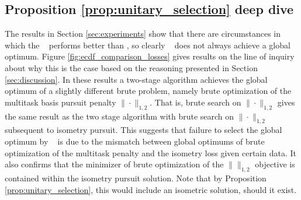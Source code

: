 \newpage

\subsection{Proposition \ref{prop:unitary_selection} deep dive}
\label{sec:deep_dive}

The results in Section \ref{sec:experiments} show that there are circumstances in which the \greedy~ performs better than \tsip, so clearly \tsip~ does not always achieve a global optimum.
Figure \ref{fig:ecdf_comparison_losses} gives results on the line of inquiry about why this is the case based on the reasoning presented in Section \ref{sec:discussion}.
In these results a two-stage algorithm achieves the global optimum of a slightly different brute problem, namely brute optimization of the multitask basis pursuit penalty $\|\cdot \|_{1,2}$.
That is, brute search on $\|\cdot \|_{1,2}$ gives the same result as the two stage algorithm with brute search on $\|\cdot \|_{1,2}$ subsequent to isometry pursuit.
This suggests that failure to select the global optimum by \tsip~ is due to the mismatch between global optimums of brute optimization of the multitask penalty and the isometry loss given certain data.
It also confirms that the minimizer of brute optimization of the $\|\|_{1,2}$ objective is contained within the isometry pursuit solution.
Note that by Proposition \ref{prop:unitary_selection}, this would include an isometric solution, should it exist.

